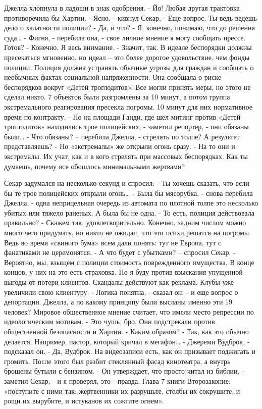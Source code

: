 \documentclass{book}
\begin{document}
Джелла хлопнула в ладоши в знак одобрения.
- Йо! Любая другая трактовка противоречила бы Хартии.
- Ясно, - кивнул Секар, - Еще вопрос. Ты ведь ведешь дело о халатности полиции?
- Да, и что?
- Я, конечно, понимаю, что до решения суда\ldots{}
- Фигня, - перебила она, - свое личное мнение я могу сообщать прессе. Готов?
- Конечно. Я весь внимание.
- Значит, так. В идеале беспорядки должны пресекаться мгновенно, но идеал – это более дорогое удовольствие, чем фонды полиции. Полиция должна устранять обычные угрозы для граждан и сообщать о необычных фактах социальной напряженности. Она сообщала о риске беспорядков вокруг «Детей троглодитов». Все могли принять меры, но этого не сделал никто. 7 объектов были разгромлены за 10 минут, а потом группа экстремального реагирования пресекла погромы. 10 минут для них нормативное время по контракту.
- Но на площади Ганди, где шел митинг против «Детей троглодитов» находились трое полицейских, - заметил репортер, - они обязаны были\ldots{}
- Что обязаны? – перебила Джелла, - стрелять по толпе? А результат представляешь?
- Но «экстремалы» же открыли огонь сразу.
- На то они и экстремалы. Их учат, как и в кого стрелять при массовых беспорядках. Как ты думаешь, почему все обошлось минимальными жертвами?

Секар задумался на несколько секунд и спросил:
- Ты хочешь сказать, что если бы те трое полицейских открыли огонь\ldots{}
- Была бы мясорубка, - снова перебила Джелла, - одна неприцельная очередь из автомата по плотной толпе это несколько убитых или тяжело раненых. А была бы не одна.
- То есть, полиция действовала правильно?
- Скажем так, удовлетворительно. Конечно, задним числом можно много чего придумать, но никто не ожидал, что эти психи решатся на погромы. Ведь во время «свиного бума» всем дали понять: тут не Европа, тут с фанатиками не церемонятся.
- А что будет с убытками? – спросил Секар.
- Вероятно, мы, взыщем с полиции стоимость поврежденного имущества. В конце концов, у них на это есть страховка. Но я буду против взыскания упущенной выгоды от потери клиентов. Скандалы действуют как реклама. Клубы уже увеличили свою клиентуру.
- Логика понятна, - сказал он, - и еще вопрос о депортации. Джелла, а по какому принципу были высланы именно эти 19 человек? Мировое общественное мнение считает, что имели место репрессии по идеологическим мотивам.
- Это чушь, бро. Они подстрекали против общественной безопасности и Хартии.
- Каким образом?
- Так, как это обычно делается. Например, пастор, который кричал в мегафон\ldots{}
- Джереми Вудброк, - подсказал он.
- Да, Вудброк. На видеозаписи есть, как он призывает поджигать и громить. После этого был разбит стеклянный фасад кинотеатра, а внутрь брошены бутыли с бензином.
- Он утверждает, что просто читал из библии, - заметил Секар, - и я проверял, это - правда. Глава 7 книги Второзаконие: «поступите с ними так: жертвенники их разрушьте, столбы их сокрушите, и рощи их вырубите, и истуканов их сожгите огнем».
\end{document}
